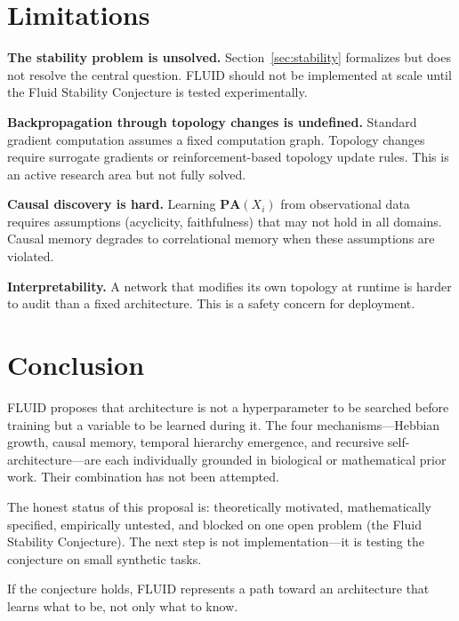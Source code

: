 \documentclass[12pt]{article}
\begin{document}
\section{Limitations}

\textbf{The stability problem is unsolved.} Section~\ref{sec:stability} formalizes but does not resolve the central question. FLUID should not be implemented at scale until the Fluid Stability Conjecture is tested experimentally.

\textbf{Backpropagation through topology changes is undefined.} Standard gradient computation assumes a fixed computation graph. Topology changes require surrogate gradients or reinforcement-based topology update rules. This is an active research area \cite{bellec2018} but not fully solved.

\textbf{Causal discovery is hard.} Learning $\mathbf{PA}(X_i)$ from observational data requires assumptions (acyclicity, faithfulness) that may not hold in all domains. Causal memory degrades to correlational memory when these assumptions are violated.

\textbf{Interpretability.} A network that modifies its own topology at runtime is harder to audit than a fixed architecture. This is a safety concern for deployment.

\section{Conclusion}

FLUID proposes that architecture is not a hyperparameter to be searched before training but a variable to be learned during it. The four mechanisms---Hebbian growth, causal memory, temporal hierarchy emergence, and recursive self-architecture---are each individually grounded in biological or mathematical prior work. Their combination has not been attempted.

The honest status of this proposal is: theoretically motivated, mathematically specified, empirically untested, and blocked on one open problem (the Fluid Stability Conjecture). The next step is not implementation---it is testing the conjecture on small synthetic tasks.

If the conjecture holds, FLUID represents a path toward an architecture that learns what to be, not only what to know.
\end{document}
